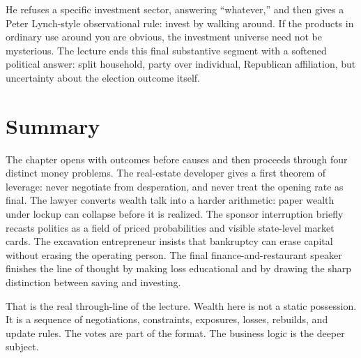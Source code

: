 He refuses a specific investment sector, answering ``whatever,'' and then gives a Peter Lynch-style observational rule: invest by walking around. If the products in ordinary use around you are obvious, the investment universe need not be mysterious. The lecture ends this final substantive segment with a softened political answer: split household, party over individual, Republican affiliation, but uncertainty about the election outcome itself.

\section{Summary}

The chapter opens with outcomes before causes and then proceeds through four distinct money problems. The real-estate developer gives a first theorem of leverage: never negotiate from desperation, and never treat the opening rate as final. The lawyer converts wealth talk into a harder arithmetic: paper wealth under lockup can collapse before it is realized. The sponsor interruption briefly recasts politics as a field of priced probabilities and visible state-level market cards. The excavation entrepreneur insists that bankruptcy can erase capital without erasing the operating person. The final finance-and-restaurant speaker finishes the line of thought by making loss educational and by drawing the sharp distinction between saving and investing.

That is the real through-line of the lecture. Wealth here is not a static possession. It is a sequence of negotiations, constraints, exposures, losses, rebuilds, and update rules. The votes are part of the format. The business logic is the deeper subject.